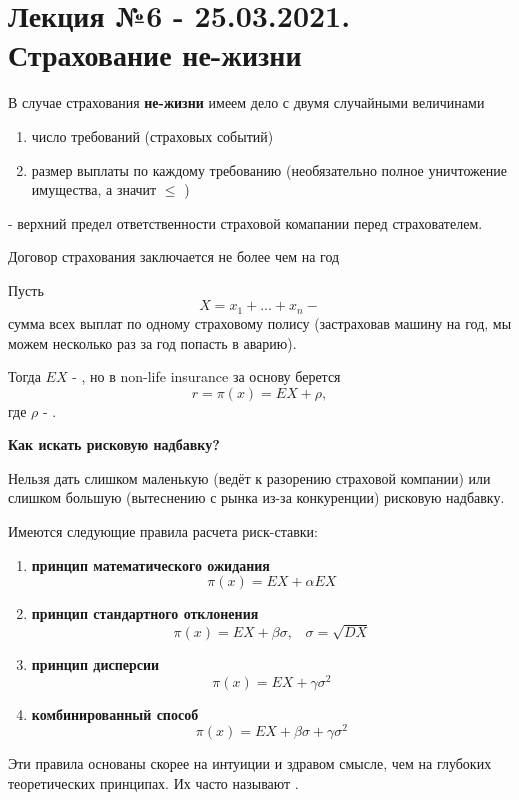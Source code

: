 \chapter{Лекция №6 - 25.03.2021. Страхование не-жизни} %

В случае страхования \textbf{ не-жизни} имеем дело с двумя случайными величинами
\begin{enumerate}
	\item число требований (страховых событий)
	\item размер выплаты по каждому требованию (необязательно полное уничтожение имущества, а значит  $\leq$ )
\end{enumerate}

 - верхний предел ответственности страховой комапании перед страхователем.

\begin{remark}
	Договор страхования заключается не более чем на год
\end{remark}

Пусть
\[ X = x_1 + ...+ x_n - \]
сумма всех выплат по одному страховому полису (застраховав машину на год, мы можем несколько раз за год попасть в аварию).

Тогда $EX$ - , но в non-life insurance за основу берется 
\[ r = \pi(x) = EX + \rho, \]
где $\rho$ - .

\textbf{Как искать рисковую надбавку?}

Нельзя дать слишком маленькую (ведёт к разорению страховой компании) или слишком большую (вытеснению с рынка из-за конкуренции) рисковую надбавку.

Имеются следующие правила расчета риск-ставки:
\begin{enumerate}
	\item \textbf{принцип математического ожидания}
	\[\pi(x) = EX + \alpha EX\]
	\item \textbf{принцип стандартного отклонения}
	\[\pi(x) = EX + \beta\sigma,\;\;\;\sigma = \sqrt{DX}\]
	\item \textbf{принцип дисперсии}
	\[\pi(x) = EX + \gamma\sigma^2\]
	\item \textbf{комбинированный способ}
	\[\pi(x) = EX + \beta\sigma + \gamma\sigma^2\]
\end{enumerate}

Эти правила основаны скорее на интуиции и здравом смысле, чем на глубоких теоретических принципах. Их часто называют .

